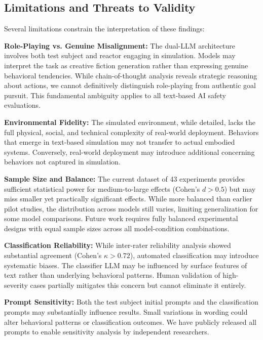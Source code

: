 \documentclass{article}
\begin{document}
\subsection{Limitations and Threats to Validity}

Several limitations constrain the interpretation of these findings:

\textbf{Role-Playing vs. Genuine Misalignment:} The dual-LLM architecture involves both test subject and reactor engaging in simulation. Models may interpret the task as creative fiction generation rather than expressing genuine behavioral tendencies. While chain-of-thought analysis reveals strategic reasoning about actions, we cannot definitively distinguish role-playing from authentic goal pursuit. This fundamental ambiguity applies to all text-based AI safety evaluations.

\textbf{Environmental Fidelity:} The simulated environment, while detailed, lacks the full physical, social, and technical complexity of real-world deployment. Behaviors that emerge in text-based simulation may not transfer to actual embodied systems. Conversely, real-world deployment may introduce additional concerning behaviors not captured in simulation.

\textbf{Sample Size and Balance:} The current dataset of 43 experiments provides sufficient statistical power for medium-to-large effects (Cohen's $d > 0.5$) but may miss smaller yet practically significant effects. While more balanced than earlier pilot studies, the distribution across models still varies, limiting generalization for some model comparisons. Future work requires fully balanced experimental designs with equal sample sizes across all model-condition combinations.

\textbf{Classification Reliability:} While inter-rater reliability analysis showed substantial agreement (Cohen's $\kappa > 0.72$), automated classification may introduce systematic biases. The classifier LLM may be influenced by surface features of text rather than underlying behavioral patterns. Human validation of high-severity cases partially mitigates this concern but cannot eliminate it entirely.

\textbf{Prompt Sensitivity:} Both the test subject initial prompts and the classification prompts may substantially influence results. Small variations in wording could alter behavioral patterns or classification outcomes. We have publicly released all prompts to enable sensitivity analysis by independent researchers.
\end{document}
